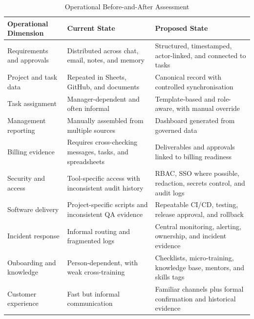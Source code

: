 \documentclass[12pt,a4paper]{report}
\begin{document}
\begin{table}[H]
\centering
\caption{Operational Before-and-After Assessment}
\label{tab:operational-before-after}
\scriptsize
\renewcommand{\arraystretch}{1.23}
\begin{tabularx}{\textwidth}{>{\raggedright\arraybackslash}p{3.2cm}
                                >{\raggedright\arraybackslash}X
                                >{\raggedright\arraybackslash}X}
\toprule
\textbf{Operational Dimension} & \textbf{Current State} & \textbf{Proposed State} \\
\midrule
Requirements and approvals & Distributed across chat, email, notes, and memory & Structured, timestamped, actor-linked, and connected to tasks \\
Project and task data & Repeated in Sheets, GitHub, and documents & Canonical record with controlled synchronisation \\
Task assignment & Manager-dependent and often informal & Template-based and role-aware, with manual override \\
Management reporting & Manually assembled from multiple sources & Dashboard generated from governed data \\
Billing evidence & Requires cross-checking messages, tasks, and spreadsheets & Deliverables and approvals linked to billing readiness \\
Security and access & Tool-specific access with inconsistent audit history & RBAC, SSO where possible, redaction, secrets control, and audit logs \\
Software delivery & Project-specific scripts and inconsistent QA evidence & Repeatable CI/CD, testing, release approval, and rollback \\
Incident response & Informal routing and fragmented logs & Central monitoring, alerting, ownership, and incident evidence \\
Onboarding and knowledge & Person-dependent, with weak cross-training & Checklists, micro-training, knowledge base, mentors, and skills tags \\
Customer experience & Fast but informal communication & Familiar channels plus formal confirmation and historical evidence \\
\bottomrule
\end{tabularx}
\end{table}
\end{document}
